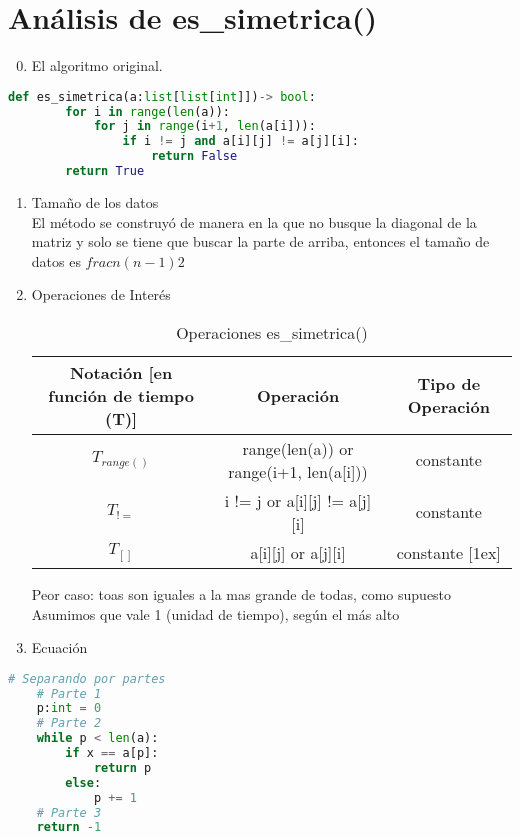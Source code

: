 \documentclass[stu, 12pt, letterpaper, donotrepeattitle, floatsintext, natbib, helv]{apa7}
\begin{document}
\section{Análisis de es\_simetrica()}
\begin{enumerate}
    \setcounter{enumi}{-1}
    \item El algoritmo original.
\end{enumerate}
\begin{lstlisting}[language=Python]
    def es_simetrica(a:list[list[int]])-> bool:
        for i in range(len(a)):
            for j in range(i+1, len(a[i])):
                if i != j and a[i][j] != a[j][i]:
                    return False
        return True
\end{lstlisting}
\begin{enumerate}
    \setcounter{enumi}{0}
    \item Tamaño de los datos \\
El método se construyó de manera en la que no busque la diagonal de la matriz y solo se tiene que buscar la parte de arriba, entonces el tamaño de datos es $frac{n(n-1)}{2}$
    \item Operaciones de Interés \\
    \begin{table}[h]
        \centering
        \begin{tabular}{|c c c|} 
         \hline
         Notación [en función de tiempo (T)] & Operación & Tipo de Operación \\ [0.5ex] 
         \hline\hline
         $T_{range()}$ & range(len(a)) or range(i+1, len(a[i])) & constante \\ 
         \hline
         $T_{!=}$ & i != j or a[i][j] != a[j][i] & constante \\
         \hline
         $T_{[]}$ & a[i][j] or a[j][i] & constante [1ex]
         \hline
        \end{tabular}
        \caption{Operaciones es\_simetrica()}
        \label{tab:tablesimetrica}
    \end{table}
        Peor caso: toas son iguales a la mas grande de todas, como supuesto \\
        Asumimos que vale 1 (unidad de tiempo), según el más alto
    \item Ecuación
    \end{enumerate}
\begin{lstlisting}[language=Python]
    # Separando por partes
    # Parte 1
    p:int = 0
    # Parte 2
    while p < len(a):
        if x == a[p]:
            return p
        else:
            p += 1
    # Parte 3
    return -1
\end{lstlisting}
\end{document}
